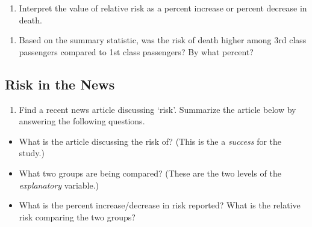 \documentclass[
]{report}
\providecommand{\tightlist}{%
  \setlength{\itemsep}{0pt}\setlength{\parskip}{0pt}}
\begin{document}
\vspace{0.5in}

\begin{enumerate}
\def\labelenumi{\arabic{enumi}.}
\setcounter{enumi}{8}
\tightlist
\item
  Interpret the value of relative risk as a percent increase or percent decrease in death.
\end{enumerate}

\vspace{0.8in}

\begin{enumerate}
\def\labelenumi{\arabic{enumi}.}
\setcounter{enumi}{9}
\tightlist
\item
  Based on the summary statistic, was the risk of death higher among 3rd class passengers compared to 1st class passengers? By what percent?
\end{enumerate}

\vspace{0.8in}

\hypertarget{risk-in-the-news}{%
\subsection{Risk in the News}\label{risk-in-the-news}}

\begin{enumerate}
\def\labelenumi{\arabic{enumi}.}
\setcounter{enumi}{10}
\tightlist
\item
  Find a recent news article discussing `risk'. Summarize the article below by answering the following questions.
\end{enumerate}

\begin{itemize}
\tightlist
\item
  What is the article discussing the risk of? (This is the a \emph{success} for the study.)
\end{itemize}

\vspace{0.5in}

\begin{itemize}
\tightlist
\item
  What two groups are being compared? (These are the two levels of the \emph{explanatory} variable.)
\end{itemize}

\vspace{0.5in}

\begin{itemize}
\tightlist
\item
  What is the percent increase/decrease in risk reported? What is the relative risk comparing the two groups?
\end{itemize}
\end{document}
